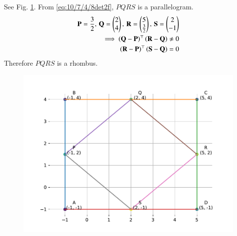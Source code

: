 \solution 
See Fig. \ref{fig:10/7/4/8Fig3}. From 
  \eqref{eq:10/7/4/8det2f}, $PQRS$ is a parallelogram.
\begin{align}
  \mathbf{P}  = 
 \frac{3}{2},\, 
 \mathbf{Q}  = \begin{pmatrix}
 2 \\
 4 \\
 \end{pmatrix} ,\,
 \mathbf{R}  = \begin{pmatrix}
 5 \\
 \frac{3}{2}
 \end{pmatrix}   
  ,\,
 \mathbf{S}  = \begin{pmatrix}
 2\\
 -1 \\
 \end{pmatrix}   
 \\
	\implies 
 \left(\mathbf{Q}-\mathbf{P}\right)^\top\left(\mathbf{R}-\mathbf{Q}\right)  \neq 0
 \\
 \left(\mathbf{R}-\mathbf{P}\right)^\top\left(\mathbf{S}-\mathbf{Q}\right)  = 0
\end{align}
Therefore $PQRS$ is a rhombus.
\begin{figure}[H]
	\begin{center}
		\includegraphics[width=0.75\columnwidth]{chapters/10/7/4/8/figs/fig.pdf}
	\end{center}
\caption{}
\label{fig:10/7/4/8Fig3}
\end{figure}

